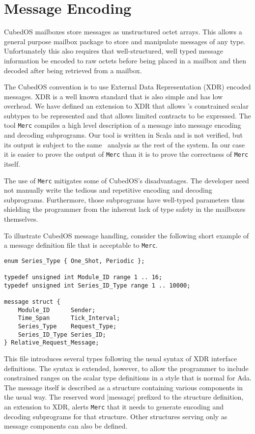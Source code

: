 
\section{Message Encoding}
\label{section-message-encoding}

CubedOS mailboxes store messages as unstructured octet arrays. This allows a general purpose
mailbox package to store and manipulate messages of any type. Unfortunately this also requires
that well-structured, well typed message information be encoded to raw octets before being
placed in a mailbox and then decoded after being retrieved from a mailbox.

The CubedOS convention is to use External Data Representation (XDR) encoded messages. XDR is a
well known standard \cite{rfc-4506} that is also simple and has low overhead. We have defined an
extension to XDR that allows \SPARK's constrained scalar subtypes to be represented and that
allows limited contracts to be expressed. The tool \texttt{Merc} compiles a high level
description of a message into message encoding and decoding subprograms. Our tool is written in
Scala and is not verified, but its output is subject to the same \SPARK\ analysis as the rest of
the system. In our case it is easier to prove the output of \texttt{Merc} than it is to prove
the correctness of \texttt{Merc} itself.

The use of \texttt{Merc} mitigates some of CubedOS's disadvantages. The developer need not
manually write the tedious and repetitive encoding and decoding subprograms. Furthermore, those
subprograms have well-typed parameters thus shielding the programmer from the inherent lack of
type safety in the mailboxes themselves.

To illustrate CubedOS message handling, consider the following short example of a message
definition file that is acceptable to \texttt{Merc}.

\begin{verbatim}
enum Series_Type { One_Shot, Periodic };

typedef unsigned int Module_ID range 1 .. 16;
typedef unsigned int Series_ID_Type range 1 .. 10000;

message struct {
    Module_ID      Sender;
    Time_Span      Tick_Interval;
    Series_Type    Request_Type;
    Series_ID_Type Series_ID;
} Relative_Request_Message;
\end{verbatim}

This file introduces several types following the usual syntax of XDR interface definitions. The
syntax is extended, however, to allow the programmer to include constrained ranges on the scalar
type definitions in a style that is normal for Ada. The message itself is described as a
structure containing various components in the usual way. The reserved word |message| prefixed
to the structure definition, an extension to XDR, alerts \texttt{Merc} that it needs to generate
encoding and decoding subprograms for that structure. Other structures serving only as message
components can also be defined.

